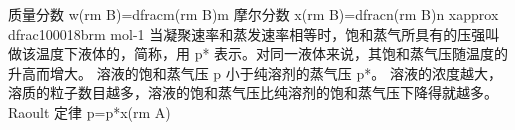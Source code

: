 质量分数 \markdownRendererDollarSign{}w(\markdownRendererLeftBrace{}\markdownRendererBackslash{}rm B\markdownRendererRightBrace{})=\markdownRendererBackslash{}dfrac\markdownRendererLeftBrace{}m(\markdownRendererLeftBrace{}\markdownRendererBackslash{}rm B\markdownRendererRightBrace{})\markdownRendererRightBrace{}\markdownRendererLeftBrace{}m\markdownRendererRightBrace{}\markdownRendererDollarSign{}\markdownRendererOlItemEnd 
{}摩尔分数 \markdownRendererDollarSign{}x(\markdownRendererLeftBrace{}\markdownRendererBackslash{}rm B\markdownRendererRightBrace{})=\markdownRendererBackslash{}dfrac\markdownRendererLeftBrace{}n(\markdownRendererLeftBrace{}\markdownRendererBackslash{}rm B\markdownRendererRightBrace{})\markdownRendererRightBrace{}\markdownRendererLeftBrace{}n\markdownRendererRightBrace{}\markdownRendererDollarSign{}\markdownRendererOlItemEnd 
\markdownRendererOlEndTight \markdownRendererInterblockSeparator
{}\markdownRendererDollarSign{}x\markdownRendererBackslash{}approx \markdownRendererBackslash{}dfrac\markdownRendererLeftBrace{}1000\markdownRendererRightBrace{}\markdownRendererLeftBrace{}18\markdownRendererRightBrace{}b\markdownRendererTilde{}\markdownRendererLeftBrace{}\markdownRendererBackslash{}rm mol\markdownRendererCircumflex{}\markdownRendererLeftBrace{}-1\markdownRendererRightBrace{}\markdownRendererRightBrace{}\markdownRendererDollarSign{}\markdownRendererInterblockSeparator
{}
\markdownRendererSectionEnd \markdownRendererSectionBegin
{}\markdownRendererInterblockSeparator
{}\markdownRendererSectionBegin
{}\markdownRendererInterblockSeparator
{}当凝聚速率和蒸发速率相等时，饱和蒸气所具有的压强叫做该温度下液体的，简称，用 \markdownRendererDollarSign{}p\markdownRendererCircumflex{}*\markdownRendererDollarSign{} 表示。对同一液体来说，其饱和蒸气压随温度的升高而增大。\markdownRendererInterblockSeparator
{}
\markdownRendererSectionEnd \markdownRendererSectionBegin
{}\markdownRendererInterblockSeparator
{}溶液的饱和蒸气压 \markdownRendererDollarSign{}p\markdownRendererDollarSign{} 小于纯溶剂的蒸气压 \markdownRendererDollarSign{}p\markdownRendererCircumflex{}*\markdownRendererDollarSign{}。\markdownRendererSoftLineBreak
{}溶液的浓度越大，溶质的粒子数目越多，溶液的饱和蒸气压比纯溶剂的饱和蒸气压下降得就越多。\markdownRendererParagraphSeparator
{}Raoult 定律 \markdownRendererDollarSign{}p=p\markdownRendererCircumflex{}*x(\markdownRendererLeftBrace{}\markdownRendererBackslash{}rm A\markdownRendererRightBrace{})\markdownRendererDollarSign{}\markdownRendererParagraphSeparator
